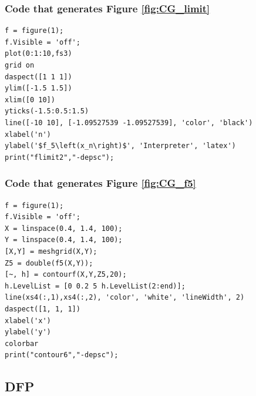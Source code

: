 \documentclass[11pt]{article} %
\let\originalleft\left
\let\originalright\right
\renewcommand{\left}{\mathopen{}\mathclose\bgroup\originalleft}
\renewcommand{\right}{\aftergroup\egroup\originalright}
\begin{document}
\subsubsection*{Code that generates Figure \ref{fig:CG_limit}}
\begin{lstlisting}
f = figure(1);
f.Visible = 'off';
plot(0:1:10,fs3)
grid on
daspect([1 1 1])
ylim([-1.5 1.5])
xlim([0 10])
yticks(-1.5:0.5:1.5)
line([-10 10], [-1.09527539 -1.09527539], 'color', 'black')
xlabel('n')
ylabel('$f_5\left(x_n\right)$', 'Interpreter', 'latex')
print("flimit2","-depsc");
\end{lstlisting}
\subsubsection*{Code that generates Figure \ref{fig:CG_f5}}
\begin{lstlisting}
f = figure(1);
f.Visible = 'off';
X = linspace(0.4, 1.4, 100);
Y = linspace(0.4, 1.4, 100);
[X,Y] = meshgrid(X,Y);
Z5 = double(f5(X,Y));
[~, h] = contourf(X,Y,Z5,20);
h.LevelList = [0 0.2 5 h.LevelList(2:end)];
line(xs4(:,1),xs4(:,2), 'color', 'white', 'lineWidth', 2)
daspect([1, 1, 1])
xlabel('x')
ylabel('y')
colorbar
print("contour6","-depsc");
\end{lstlisting}
\subsection*{DFP}
\end{document}
